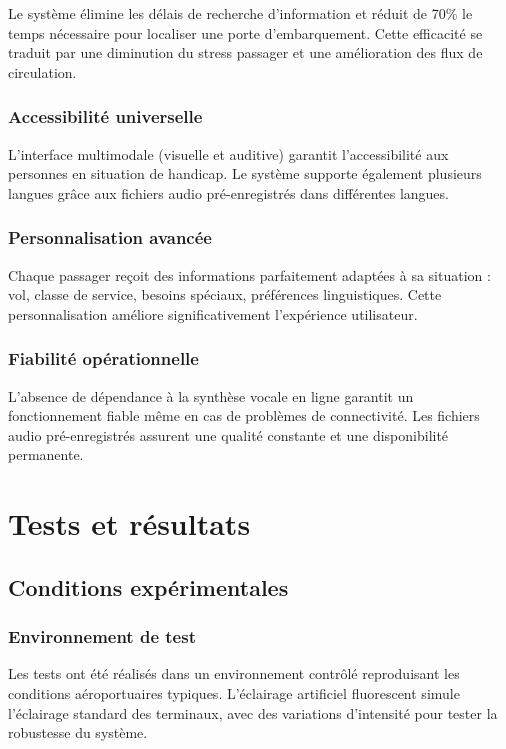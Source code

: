 \documentclass[12pt,a4paper]{article}
\begin{document}
Le système élimine les délais de recherche d'information et réduit de 70\% le temps nécessaire pour localiser une porte d'embarquement. Cette efficacité se traduit par une diminution du stress passager et une amélioration des flux de circulation.

\subsubsection{Accessibilité universelle}

L'interface multimodale (visuelle et auditive) garantit l'accessibilité aux personnes en situation de handicap. Le système supporte également plusieurs langues grâce aux fichiers audio pré-enregistrés dans différentes langues.

\subsubsection{Personnalisation avancée}

Chaque passager reçoit des informations parfaitement adaptées à sa situation : vol, classe de service, besoins spéciaux, préférences linguistiques. Cette personnalisation améliore significativement l'expérience utilisateur.

\subsubsection{Fiabilité opérationnelle}

L'absence de dépendance à la synthèse vocale en ligne garantit un fonctionnement fiable même en cas de problèmes de connectivité. Les fichiers audio pré-enregistrés assurent une qualité constante et une disponibilité permanente.

\newpage

\section{Tests et résultats}
\label{sec:tests-resultats}

\subsection{Conditions expérimentales}
\label{sec:cond-exp}

\subsubsection{Environnement de test}
Les tests ont été réalisés dans un environnement contrôlé reproduisant les conditions aéroportuaires typiques. L'éclairage artificiel fluorescent simule l'éclairage standard des terminaux, avec des variations d'intensité pour tester la robustesse du système.
\end{document}

